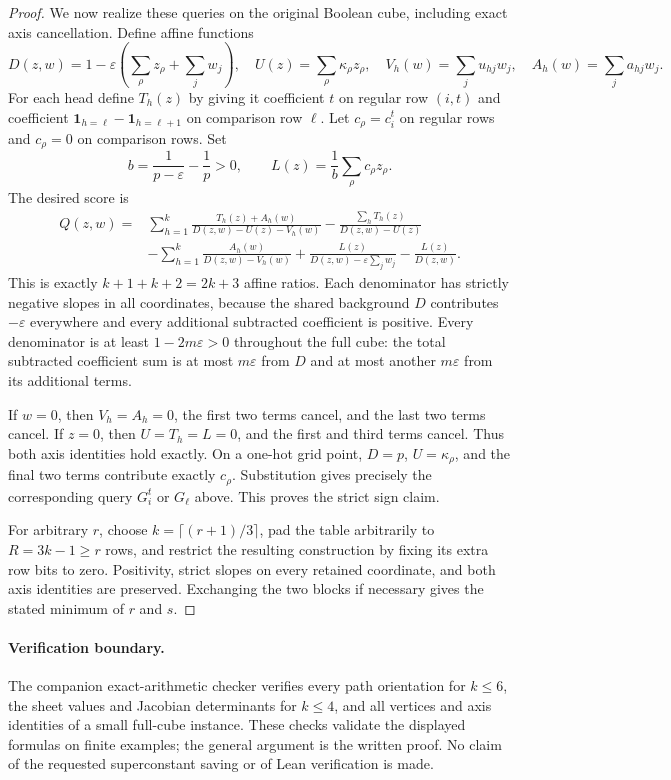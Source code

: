\documentclass[11pt]{article}
\begin{document}
\begin{proof}
We now realize these queries on the original Boolean cube, including
exact axis cancellation. Define affine functions
\[
 D(z,w)=1-\varepsilon\left(\sum_\rho z_\rho+\sum_jw_j\right),
 \quad U(z)=\sum_\rho\kappa_\rho z_\rho,
 \quad V_h(w)=\sum_j u_{hj}w_j,
 \quad A_h(w)=\sum_j a_{hj}w_j.
\]
For each head define $T_h(z)$ by giving it coefficient $t$ on regular
row $(i,t)$ and coefficient
$\mathbf1_{h=\ell}-\mathbf1_{h=\ell+1}$ on comparison row $\ell$.
Let $c_\rho=c_i^t$ on regular rows and $c_\rho=0$ on comparison rows.
Set
\[
 b=\frac1{p-\varepsilon}-\frac1p>0,
 \qquad L(z)=\frac1b\sum_\rho c_\rho z_\rho.
\]
The desired score is
\[
\begin{split}
 Q(z,w)={}&\sum_{h=1}^k\frac{T_h(z)+A_h(w)}{D(z,w)-U(z)-V_h(w)}
       -\frac{\sum_hT_h(z)}{D(z,w)-U(z)}\\
 &-\sum_{h=1}^k\frac{A_h(w)}{D(z,w)-V_h(w)}
       +\frac{L(z)}{D(z,w)-\varepsilon\sum_jw_j}
       -\frac{L(z)}{D(z,w)}.
\end{split}
\]
This is exactly $k+1+k+2=2k+3$ affine ratios. Each denominator
has strictly negative slopes in all coordinates, because the shared
background $D$ contributes $-\varepsilon$ everywhere and every
additional subtracted coefficient is positive. Every denominator
is at least $1-2m\varepsilon>0$ throughout the full cube: the total
subtracted coefficient sum is at most $m\varepsilon$ from $D$ and
at most another $m\varepsilon$ from its additional terms.

If $w=0$, then $V_h=A_h=0$, the first two terms cancel, and the
last two terms cancel. If $z=0$, then $U=T_h=L=0$, and the first
and third terms cancel. Thus both axis identities hold exactly.
On a one-hot grid point, $D=p$, $U=\kappa_\rho$, and the final two
terms contribute exactly $c_\rho$. Substitution gives precisely the
corresponding query $G_i^t$ or $G_\ell$ above. This proves the strict
sign claim.

For arbitrary $r$, choose $k=\lceil(r+1)/3\rceil$, pad the table
arbitrarily to $R=3k-1\geq r$ rows, and restrict the resulting
construction by fixing its extra row bits to zero. Positivity,
strict slopes on every retained coordinate, and both axis identities
are preserved. Exchanging the two blocks if necessary gives the
stated minimum of $r$ and $s$.
\end{proof}

\paragraph{Verification boundary.}
The companion exact-arithmetic checker verifies every path orientation
for $k\leq6$, the sheet values and Jacobian determinants for $k\leq4$,
and all vertices and axis identities of a small full-cube instance.
These checks validate the displayed formulas on finite examples;
the general argument is the written proof. No claim of the requested
superconstant saving or of Lean verification is made.
\end{document}

